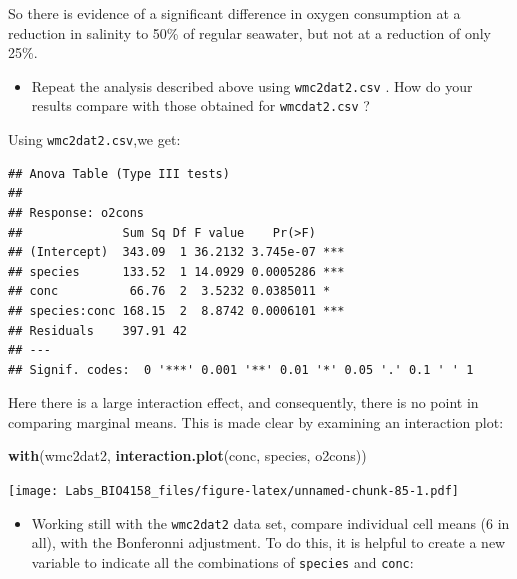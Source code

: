 \documentclass[
  12pt,
]{book}
\newenvironment{Shaded}{\begin{snugshade}}{\end{snugshade}}
\newcommand{\KeywordTok}[1]{\textcolor[rgb]{0.13,0.29,0.53}{\textbf{#1}}}
\newcommand{\NormalTok}[1]{#1}
\newcommand{\OperatorTok}[1]{\textcolor[rgb]{0.81,0.36,0.00}{\textbf{#1}}}
\newcommand{\StringTok}[1]{\textcolor[rgb]{0.31,0.60,0.02}{#1}}
\providecommand{\tightlist}{%
  \setlength{\itemsep}{0pt}\setlength{\parskip}{0pt}}
\begin{document}
So there is evidence of a significant difference in oxygen consumption at a reduction in salinity to 50\% of regular seawater, but not at a reduction of only 25\%.

\begin{itemize}
\tightlist
\item
  Repeat the analysis described above using \texttt{wmc2dat2.csv} . How do
  your results compare with those obtained for \texttt{wmcdat2.csv} ?
\end{itemize}

Using \texttt{wmc2dat2.csv},we get:

\begin{verbatim}
## Anova Table (Type III tests)
## 
## Response: o2cons
##              Sum Sq Df F value    Pr(>F)    
## (Intercept)  343.09  1 36.2132 3.745e-07 ***
## species      133.52  1 14.0929 0.0005286 ***
## conc          66.76  2  3.5232 0.0385011 *  
## species:conc 168.15  2  8.8742 0.0006101 ***
## Residuals    397.91 42                      
## ---
## Signif. codes:  0 '***' 0.001 '**' 0.01 '*' 0.05 '.' 0.1 ' ' 1
\end{verbatim}

Here there is a large interaction effect, and consequently, there is no
point in comparing marginal means. This is made clear by examining
an interaction plot:

\begin{Shaded}
\begin{Highlighting}[]
\KeywordTok{with}\NormalTok{(wmc2dat2, }\KeywordTok{interaction.plot}\NormalTok{(conc, species, o2cons))}
\end{Highlighting}
\end{Shaded}

\texttt{[image: Labs\_BIO4158\_files/figure-latex/unnamed-chunk-85-1.pdf]}

\begin{itemize}
\tightlist
\item
  Working still with the \texttt{wmc2dat2} data set, compare individual cell means (6 in all), with the Bonferonni adjustment. To do this, it is helpful to create a new variable to indicate all the combinations of \texttt{species} and \texttt{conc}:
\end{itemize}

\begin{Shaded}
\end{Shaded}
\end{document}
